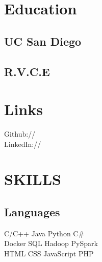 \documentclass[]{deedy-resume-openfont}
\begin{document}
%
%

\sectionsep

%
%

\begin{minipage}[t]{0.33\textwidth} 


\section{Education} 

\subsection{UC San Diego}
\sectionsep

\subsection{R.V.C.E}
\sectionsep


\section{Links} 
Github:// \href{https://github.com/bala8}{} \\
LinkedIn://  \href{https://www.linkedin.com/in/balacp/}{} \\
\sectionsep

\section{SKILLS}

\subsection{Languages}
C/C++ \textbullet{} Java \textbullet{} Python \textbullet{} C\#\\ 
Docker \textbullet{} SQL \textbullet{} Hadoop \textbullet{} PySpark \\
HTML \textbullet{} CSS \textbullet{} JavaScript \textbullet{} PHP \\
\sectionsep


\end{minipage}
\end{document}
